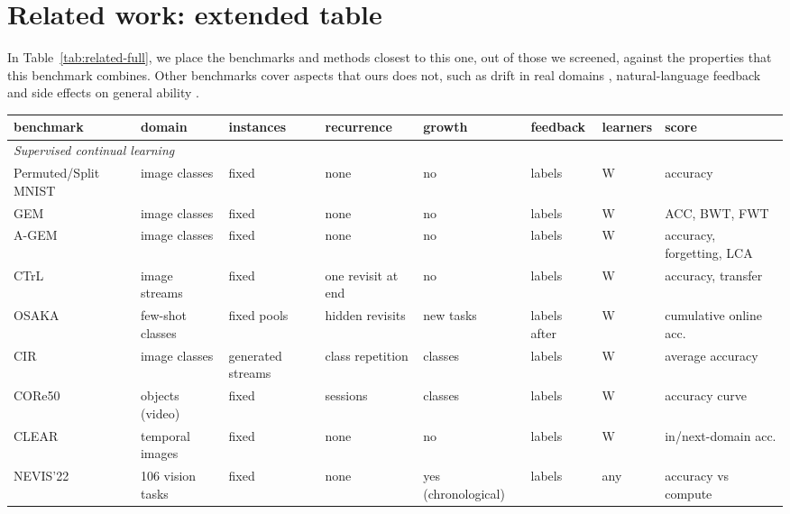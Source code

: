 \section{Related work: extended table}
\label{app:related}

In Table~\ref{tab:related-full}, we place the benchmarks and methods closest to this one, out of those we screened, against the properties that this benchmark combines.  Other benchmarks cover aspects that ours does not, such as drift in real domains \citep{lomonaco2017core50,lin2022clear}, natural-language feedback \citep{ai2025memorybench} and side effects on general ability \citep{wang2023trace}.

\begin{table}
\centering
\scriptsize
\setlength{\tabcolsep}{4pt}
\begin{adjustbox}{max width=\textheight}
\begin{tabular}{llllllll}
\toprule
benchmark & domain & instances & recurrence & growth & feedback & learners & score \\
\midrule
\multicolumn{8}{l}{\emph{Supervised continual learning}} \\
Permuted/Split MNIST \citep{goodfellow2013empirical,zenke2017continual} & image classes & fixed & none & no & labels & W & accuracy \\
GEM \citep{lopezpaz2017gradient} & image classes & fixed & none & no & labels & W & ACC, BWT, FWT \\
A-GEM \citep{chaudhry2019efficient} & image classes & fixed & none & no & labels & W & accuracy, forgetting, LCA \\
CTrL \citep{veniat2021efficient} & image streams & fixed & one revisit at end & no & labels & W & accuracy, transfer \\
OSAKA \citep{caccia2020online} & few-shot classes & fixed pools & hidden revisits & new tasks & labels after & W & cumulative online acc. \\
CIR \citep{hemati2023class,hemati2025repetition} & image classes & generated streams & class repetition & classes & labels & W & average accuracy \\
CORe50 \citep{lomonaco2017core50} & objects (video) & fixed & sessions & classes & labels & W & accuracy curve \\
CLEAR \citep{lin2022clear} & temporal images & fixed & none & no & labels & W & in/next-domain acc. \\
NEVIS'22 \citep{bornschein2022nevis} & 106 vision tasks & fixed & none & yes (chronological) & labels & any & accuracy vs compute \\

\end{tabular}
\end{adjustbox}
\end{table}
